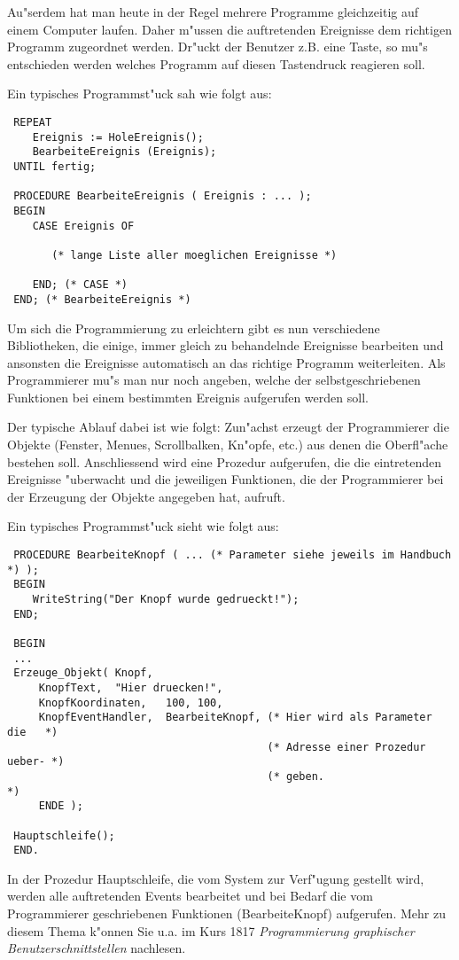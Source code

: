  Au"serdem hat man heute in der Regel mehrere Programme gleichzeitig
 auf einem Computer laufen. Daher m"ussen die auftretenden Ereignisse
 dem richtigen Programm zugeordnet werden. Dr"uckt der Benutzer z.B.
 eine Taste, so mu"s entschieden werden welches Programm auf diesen
 Tastendruck reagieren soll.
 
 Ein typisches Programmst"uck sah wie folgt aus:
\begin{verbatim}
 REPEAT
    Ereignis := HoleEreignis();
    BearbeiteEreignis (Ereignis);
 UNTIL fertig;

 PROCEDURE BearbeiteEreignis ( Ereignis : ... );
 BEGIN
    CASE Ereignis OF

       (* lange Liste aller moeglichen Ereignisse *)

    END; (* CASE *)
 END; (* BearbeiteEreignis *)
\end{verbatim}

 Um sich die Programmierung zu erleichtern gibt es nun verschiedene
 Bibliotheken, die einige, immer gleich zu behandelnde Ereignisse
 bearbeiten und ansonsten die Ereignisse automatisch an das richtige
 Programm weiterleiten. Als Programmierer mu"s man nur noch angeben,
 welche der selbstgeschriebenen Funktionen bei einem bestimmten
 Ereignis aufgerufen werden soll.

 Der typische Ablauf dabei ist wie folgt: Zun"achst erzeugt der
 Programmierer die Objekte (Fenster, Menues, Scrollbalken, Kn"opfe, etc.)
 aus denen die Oberfl"ache bestehen soll. Anschliessend wird eine
 Prozedur aufgerufen, die die eintretenden Ereignisse "uberwacht und
 die jeweiligen Funktionen, die der Programmierer bei der Erzeugung
 der Objekte angegeben hat, aufruft.

 Ein typisches Programmst"uck sieht wie folgt aus:
\begin{verbatim}
 PROCEDURE BearbeiteKnopf ( ... (* Parameter siehe jeweils im Handbuch *) );
 BEGIN
    WriteString("Der Knopf wurde gedrueckt!");
 END;

 BEGIN
 ...
 Erzeuge_Objekt( Knopf, 
     KnopfText,  "Hier druecken!",
     KnopfKoordinaten,   100, 100,
     KnopfEventHandler,  BearbeiteKnopf, (* Hier wird als Parameter die   *)
                                         (* Adresse einer Prozedur ueber- *)
                                         (* geben.                        *)
     ENDE );

 Hauptschleife();
 END.
\end{verbatim}

 In der Prozedur Hauptschleife, die vom System zur Verf"ugung gestellt wird,
 werden alle auftretenden Events bearbeitet und bei Bedarf die vom
 Programmierer geschriebenen Funktionen (BearbeiteKnopf) aufgerufen.
 Mehr zu diesem Thema k"onnen Sie u.a. im Kurs 1817 {\em Programmierung
 graphischer Benutzerschnittstellen} nachlesen.

